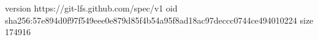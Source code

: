 version https://git-lfs.github.com/spec/v1
oid sha256:57e894d0f97f549eee0e879d85f4b54a95f8ad18ac97deccc0744ce494010224
size 174916
